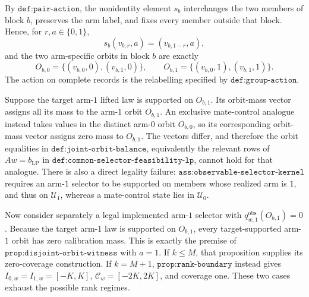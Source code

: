 By \(\texttt{def:pair-action}\), the nonidentity element \(s_b\) interchanges the two members of block \(b\), preserves the arm label, and fixes every member outside that block. Hence, for \(r,a\in\{0,1\}\),
\[
s_b(v_{b,r},a)=(v_{b,1-r},a),
\]
and the two arm-specific orbits in block \(b\) are exactly
\[
O_{b,0}=\{(v_{b,0},0),(v_{b,1},0)\},\qquad O_{b,1}=\{(v_{b,0},1),(v_{b,1},1)\}.
\]
The action on complete records is the relabelling specified by \(\texttt{def:group-action}\).

Suppose the target arm-\(1\) lifted law is supported on \(O_{b,1}\). Its orbit-mass vector assigns all its mass to the arm-\(1\) orbit \(O_{b,1}\). An exclusive mate-control analogue instead takes values in the distinct arm-\(0\) orbit \(O_{b,0}\), so its corresponding orbit-mass vector assigns zero mass to \(O_{b,1}\). The vectors differ, and therefore the orbit equalities in \(\texttt{def:joint-orbit-balance}\), equivalently the relevant rows of \(Aw=b_{\mathrm{LP}}\) in \(\texttt{def:common-selector-feasibility-lp}\), cannot hold for that analogue. There is also a direct legality failure: \(\texttt{ass:observable-selector-kernel}\) requires an arm-\(1\) selector to be supported on members whose realized arm is \(1\), and thus on \(\mathcal U_1\), whereas a mate-control state lies in \(\mathcal U_0\).

Now consider separately a legal implemented arm-\(1\) selector with \(q^{\mathrm{obs}}_{w,1}(O_{b,1})=0\). Because the target arm-\(1\) law is supported on \(O_{b,1}\), every target-supported arm-\(1\) orbit has zero calibration mass. This is exactly the premise of \(\texttt{prop:disjoint-orbit-witness}\) with \(a=1\). If \(k\le M\), that proposition supplies its zero-coverage construction. If \(k=M+1\), \(\texttt{prop:rank-boundary}\) instead gives \(I_{0,w}=I_{1,w}=[-K,K]\), \(\mathcal C_w=[-2K,2K]\), and coverage one. These two cases exhaust the possible rank regimes.